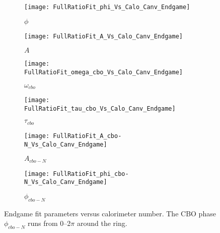\begin{figure}[]
\centering
    \begin{subfigure}[]{0.45\textwidth}
        \centering
        \texttt{[image: FullRatioFit\_phi\_Vs\_Calo\_Canv\_Endgame]}
        \caption{$\phi$}
    \end{subfigure}%
    \begin{subfigure}[]{0.45\textwidth}
        \centering
        \texttt{[image: FullRatioFit\_A\_Vs\_Calo\_Canv\_Endgame]}
        \caption{$A$}
    \end{subfigure}

    \begin{subfigure}[]{0.45\textwidth}
        \centering
        \texttt{[image: FullRatioFit\_omega\_cbo\_Vs\_Calo\_Canv\_Endgame]}
        \caption{$\omega_{cbo}$}
    \end{subfigure}%
    \begin{subfigure}[]{0.45\textwidth}
        \centering
        \texttt{[image: FullRatioFit\_tau\_cbo\_Vs\_Calo\_Canv\_Endgame]}
        \caption{$\tau_{cbo}$}
    \end{subfigure}

    \begin{subfigure}[]{0.45\textwidth}
        \centering
        \texttt{[image: FullRatioFit\_A\_cbo-N\_Vs\_Calo\_Canv\_Endgame]}
        \caption{$A_{cbo-N}$}
    \end{subfigure}%
    \begin{subfigure}[]{0.45\textwidth}
        \centering
        \texttt{[image: FullRatioFit\_phi\_cbo-N\_Vs\_Calo\_Canv\_Endgame]}
        \caption{$\phi_{cbo-N}$}
    \end{subfigure}
\caption[Endgame fit parameters versus calorimeter number]{Endgame fit parameters versus calorimeter number. The CBO phase $\phi_{cbo-N}$ runs from 0--2$\pi$ around the ring.}
\label{fig:caloFits_EndgamePars_1}
\end{figure}

